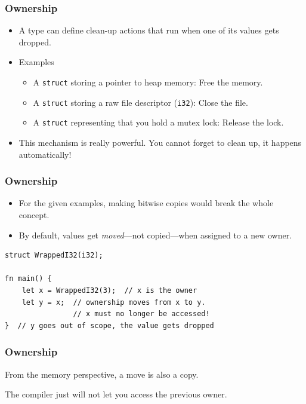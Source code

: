 \begin{frame}[fragile]
    \frametitle{Ownership}
    \begin{itemize}
        \item A type can define clean-up actions that run when one of its values gets dropped.
        \pause
        \item Examples
        \begin{itemize}
            \item A \texttt{struct} storing a pointer to heap memory: Free the memory.
            \item A \texttt{struct} storing a raw file descriptor (\texttt{i32}): Close the file.
            \item A \texttt{struct} representing that you hold a mutex lock: Release the lock.
        \end{itemize}
        \pause
        \item This mechanism is really powerful. You cannot forget to clean up, it happens automatically!
    \end{itemize}
\end{frame}

\begin{frame}[fragile]
    \frametitle{Ownership}
    \begin{itemize}
        \item For the given examples, making bitwise copies would break the whole concept.
        \pause
        \item By default, values get \textit{moved}---not copied---when assigned to a new owner.
    \end{itemize}
    \pause
    \vfill
    \begin{verbatim}
struct WrappedI32(i32);

fn main() {
    let x = WrappedI32(3);  // x is the owner
    let y = x;  // ownership moves from x to y.
                // x must no longer be accessed!
}  // y goes out of scope, the value gets dropped
    \end{verbatim}
\end{frame}

\begin{frame}[fragile]
    \frametitle{Ownership}
    From the memory perspective, a move is also a copy.
    \pause
    \vfill
    \begin{center}
    \end{center}
    \pause
    \vfill
    The compiler just will not let you access the previous owner.
\end{frame}

